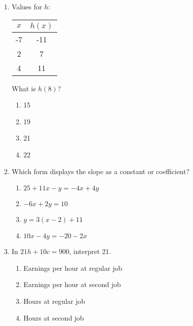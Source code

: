 \documentclass[12pt]{exam}
\begin{document}
\begin{enumerate}
\begin{center}
        \centering
        \texttt{[image: Screenshot 2025-06-24 at 19.17.15.png]}
    \end{center}
    \begin{enumerate}[label=\Alph*)]
        \item $2.00
        \item $2.60
        \item $3.00
        \item $5.00
    \end{enumerate}
    \item Values for $h$:
    \begin{center}
        \begin{tabular}{|c|c|}
            \hline
            $x$ & $h(x)$ \\
            \hline
            -7 & -11 \\
            2 & 7 \\
            4 & 11 \\
            \hline
        \end{tabular}
    \end{center}
    What is $h(8)$?
    \begin{enumerate}[label=\Alph*)]
        \item 15
        \item 19
        \item 21
        \item 22
    \end{enumerate}
    \item Which form displays the slope as a constant or coefficient?
    \begin{enumerate}[label=\Alph*)]
        \item $25 + 11x - y = -4x + 4y$
        \item $-6x + 2y = 10$
        \item $y = 3(x - 2) + 11$
        \item $10x - 4y = -20 - 2x$
    \end{enumerate}
    \item In $21h + 10c = 900$, interpret 21.
    \begin{enumerate}[label=\Alph*)]
        \item Earnings per hour at regular job
        \item Earnings per hour at second job
        \item Hours at regular job
        \item Hours at second job

\end{enumerate}
\end{enumerate}
\end{document}
